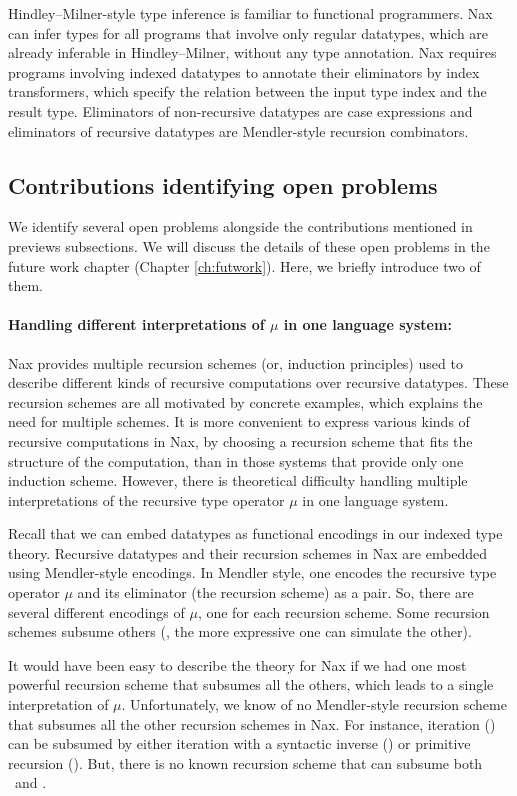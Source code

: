 Hindley--Milner-style type inference is familiar 
to functional programmers.
Nax can infer types for all programs that involve only regular datatypes,
which are already inferable in Hindley--Milner, without any type annotation.
Nax requires programs involving indexed datatypes to annotate their eliminators
by index transformers, which specify the relation between the input type index
and the result type. Eliminators of non-recursive datatypes are case expressions
and eliminators of recursive datatypes are Mendler-style recursion combinators.

\subsection{Contributions identifying open problems}
We identify several open problems alongside the contributions mentioned
in previews subsections. We will discuss the details of these open problems
in the future work chapter (Chapter \ref{ch:futwork}).
Here, we briefly introduce two of them.

\paragraph{Handling different interpretations of $\mu$ in one language system:}
Nax provides multiple recursion schemes (or, induction principles) used
to describe different kinds of recursive computations over recursive datatypes.
These recursion schemes are all motivated by concrete examples, which explains
the need for multiple schemes. It is more convenient to express various kinds of
recursive computations in Nax, by choosing a recursion scheme that fits
the structure of the computation, than in those systems that provide
only one induction scheme. However, there is theoretical difficulty
handling multiple interpretations of the recursive type operator $\mu$
in one language system.

Recall that we can embed datatypes as functional encodings in
our indexed type theory. Recursive datatypes and their recursion schemes in Nax
are embedded using Mendler-style encodings.
In Mendler style, one encodes the recursive type operator $\mu$
and its eliminator (the recursion scheme) as a pair.
So, there are several different encodings of $\mu$,
one for each recursion scheme. Some recursion schemes subsume others
(\ie, the more expressive one can simulate the other).

It would have been easy to describe the theory for Nax if we had
one most powerful recursion scheme that subsumes all the others,
which leads to a single interpretation of $\mu$. Unfortunately, we know of
no Mendler-style recursion scheme that subsumes all the other recursion schemes
in Nax. For instance, iteration (\MIt) can be subsumed by either 
iteration with a syntactic inverse (\MsfIt) or primitive recursion (\MPr).
But, there is no known recursion scheme that can subsume both \MsfIt\ and \MPr.


